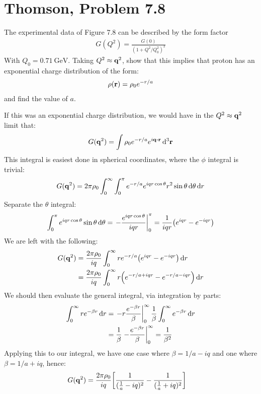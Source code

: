 \documentclass[12pt]{article}
\begin{document}
\section{Thomson, Problem 7.8}
\begin{problem}
  The experimental data of Figure 7.8 can be described by the form factor
  \begin{align*}
    G(Q^2)=\frac{G(0)}{(1+Q^2/Q_0^2)^2}
  \end{align*}
  With $Q_0=\SI{0.71}{\GeV}$. Taking $Q^2\approx\vb{q}^2$, show that this implies that proton has an exponential charge distribution of the form:
  \begin{align*}
    \rho(\vb{r})=\rho_0e^{-r/a}
  \end{align*}
  and find the value of $a$.
\end{problem}
If this was an exponential charge distribution, we would have in the $Q^2\approx\vb{q}^2$ limit that:
\begin{align*}
  G(\vb{q}^2)=\int\rho_0e^{-r/a}e^{i\vb{q\vdot r}}\dd[3]{\vb{r}}
\end{align*}
This integral is easiest done in spherical coordinates, where the $\phi$ integral is trivial:
\begin{align*}
  G(\vb{q}^2)=2\pi\rho_0\int_0^\infty\int_0^\pi e^{-r/a}e^{iqr\cos\theta}
  r^2\sin\theta\dd{\theta}\dd{r}
\end{align*}
Separate the $\theta$ integral:
\begin{align*}
  \int_0^\pi e^{iqr\cos\theta}\sin\theta\dd{\theta}
  =\eval{-\frac{e^{iqr\cos\theta}}{iqr}}_0^\pi
  =\frac1{iqr}\qty(e^{iqr}-e^{-iqr})
\end{align*}
We are left with the following:
\begin{align*}
  G(\vb{q}^2)&=\frac{2\pi\rho_0}{iq}
  \int_0^\infty re^{-r/a}\qty(e^{iqr}-e^{-iqr})\dd{r}\\
  &=\frac{2\pi\rho_0}{iq}
  \int_0^\infty r\qty(e^{-r/a+iqr}-e^{-r/a-iqr})\dd{r}
\end{align*}
We should then evaluate the general integral, via integration by parts:
\begin{align*}
  \int_0^\infty re^{-\beta r}\dd{r}&=
  \eval{-r\frac{e^{-\beta r}}{\beta}}_0^\infty
  \frac1\beta\int_0^\infty e^{-\beta r}\dd{r}\\
  &=\frac1\beta\eval{-\frac{e^{-\beta r}}\beta}_0^\infty=\frac1{\beta^2}
\end{align*}
Applying this to our integral, we have one case where $\beta=1/a-iq$ and one where $\beta=1/a+iq$, hence:
\begin{align*}
  G(\vb{q}^2)&=\frac{2\pi\rho_0}{iq}
  \qty[\frac1{(\frac1a-iq)^2}-\frac1{(\frac1a+iq)^2}]
\end{align*}
\end{document}
